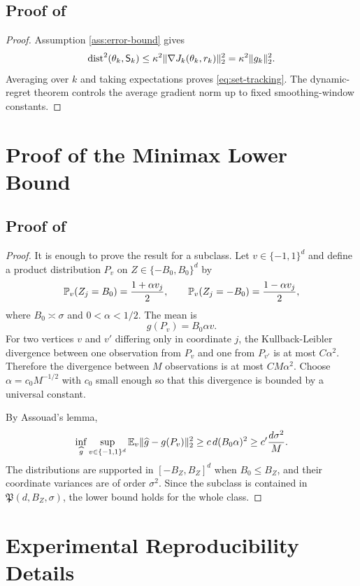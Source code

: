\documentclass[11pt]{article}
\newcommand{\E}{\mathbb E}
\newcommand{\Pp}{\mathbb P}
\newcommand{\1}{\mathbf 1}
\newcommand{\dist}{\operatorname{dist}}
\DeclarePairedDelimiter{\norm}{\lVert}{\rVert}
\newcommand{\Sta}{\mathsf S}
\begin{document}
\subsection{Proof of }
\begin{proof}
Assumption \ref{ass:error-bound} gives
\[
 \dist^2(\theta_k,\Sta_k)\le \kappa^2\norm{\nabla J_k(\theta_k,r_k)}_2^2=\kappa^2\norm{g_k}_2^2.
\]
Averaging over $k$ and taking expectations proves \eqref{eq:set-tracking}.  The dynamic-regret theorem controls the average gradient norm up to fixed smoothing-window constants.
\end{proof}

\section{Proof of the Minimax Lower Bound}\label{app:minimax-proof}

\subsection{Proof of }
\begin{proof}
It is enough to prove the result for a subclass.  Let $v\in\{-1,1\}^d$ and define a product distribution $P_v$ on $Z\in\{-B_0,B_0\}^d$ by
\[
 \Pp_v(Z_j=B_0)={1+\alpha v_j\over2},
 \qquad
 \Pp_v(Z_j=-B_0)={1-\alpha v_j\over2},
\]
where $B_0\asymp \sigma$ and $0<\alpha<1/2$.  The mean is
\[
 g(P_v)=B_0\alpha v.
\]
For two vertices $v$ and $v'$ differing only in coordinate $j$, the Kullback-Leibler divergence between one observation from $P_v$ and one from $P_{v'}$ is at most $C\alpha^2$.  Therefore the divergence between $M$ observations is at most $CM\alpha^2$.  Choose $\alpha=c_0M^{-1/2}$ with $c_0$ small enough so that this divergence is bounded by a universal constant.

By Assouad's lemma,
\[
 \inf_{\widehat g}\sup_{v\in\{-1,1\}^d}
 \E_v\norm{\widehat g-g(P_v)}_2^2
 \ge c\,d(B_0\alpha)^2
 \ge c' {d\sigma^2\over M}.
\]
The distributions are supported in $[-B_Z,B_Z]^d$ when $B_0\le B_Z$, and their coordinate variances are of order $\sigma^2$.  Since the subclass is contained in $\mathfrak P(d,B_Z,\sigma)$, the lower bound holds for the whole class.
\end{proof}

\section{Experimental Reproducibility Details}\label{app:experiments}
\end{document}
